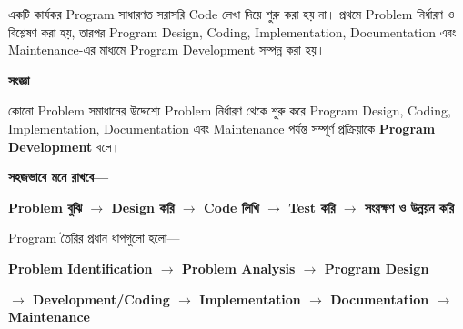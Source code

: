 
একটি কার্যকর Program সাধারণত সরাসরি Code লেখা দিয়ে শুরু করা হয় না।
প্রথমে Problem নির্ধারণ ও বিশ্লেষণ করা হয়, তারপর Program Design,
Coding, Implementation, Documentation এবং Maintenance-এর মাধ্যমে
Program Development সম্পন্ন করা হয়।


\begin{definitionbox}

\textbf{\color{darkTeal}সংজ্ঞা}

কোনো Problem সমাধানের উদ্দেশ্যে Problem নির্ধারণ থেকে শুরু করে
Program Design, Coding, Implementation, Documentation এবং
Maintenance পর্যন্ত সম্পূর্ণ প্রক্রিয়াকে
\textbf{Program Development} বলে।

\end{definitionbox}

\textbf{সহজভাবে মনে রাখবে—}

\begin{center}

\textbf{
Problem বুঝি
\(\longrightarrow\)
Design করি
\(\longrightarrow\)
Code লিখি
\(\longrightarrow\)
Test করি
\(\longrightarrow\)
সংরক্ষণ ও উন্নয়ন করি
}

\end{center}


Program তৈরির প্রধান ধাপগুলো হলো—

\begin{center}

\textbf{
Problem Identification
\(\rightarrow\)
Problem Analysis
\(\rightarrow\)
Program Design
}

\vspace{0.6mm}

\textbf{
\(\rightarrow\)
Development/Coding
\(\rightarrow\)
Implementation
\(\rightarrow\)
Documentation
\(\rightarrow\)
Maintenance
}

\end{center}

